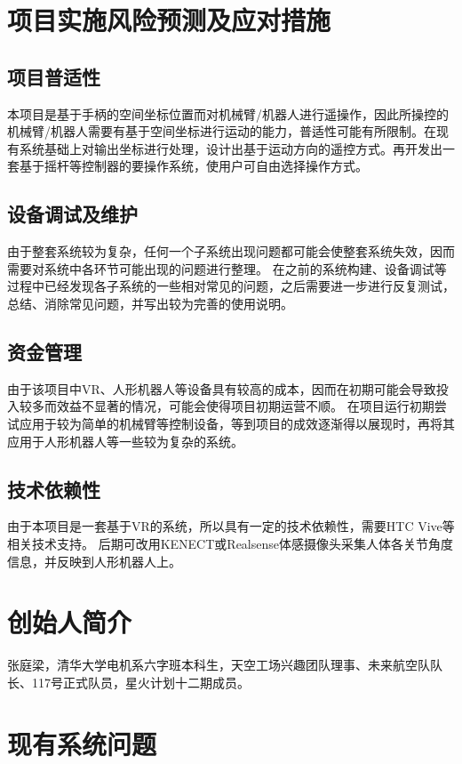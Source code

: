 \chapter{项目实施风险预测及应对措施}
\section{项目普适性}
	
本项目是基于手柄的空间坐标位置而对机械臂/机器人进行遥操作，因此所操控的机械臂/机器人需要有基于空间坐标进行运动的能力，普适性可能有所限制。在现有系统基础上对输出坐标进行处理，设计出基于运动方向的遥控方式。再开发出一套基于摇杆等控制器的要操作系统，使用户可自由选择操作方式。
\section{设备调试及维护}
由于整套系统较为复杂，任何一个子系统出现问题都可能会使整套系统失效，因而需要对系统中各环节可能出现的问题进行整理。	在之前的系统构建、设备调试等过程中已经发现各子系统的一些相对常见的问题，之后需要进一步进行反复测试，总结、消除常见问题，并写出较为完善的使用说明。
\section{资金管理}

由于该项目中VR、人形机器人等设备具有较高的成本，因而在初期可能会导致投入较多而效益不显著的情况，可能会使得项目初期运营不顺。	在项目运行初期尝试应用于较为简单的机械臂等控制设备，等到项目的成效逐渐得以展现时，再将其应用于人形机器人等一些较为复杂的系统。
\section{技术依赖性}

由于本项目是一套基于VR的系统，所以具有一定的技术依赖性，需要HTC Vive等相关技术支持。	后期可改用KENECT或Realsense体感摄像头采集人体各关节角度信息，并反映到人形机器人上。



\chapter{创始人简介}
张庭梁，清华大学电机系六字班本科生，天空工场兴趣团队理事、未来航空队队长、117号正式队员，星火计划十二期成员。



\chapter{现有系统问题}

